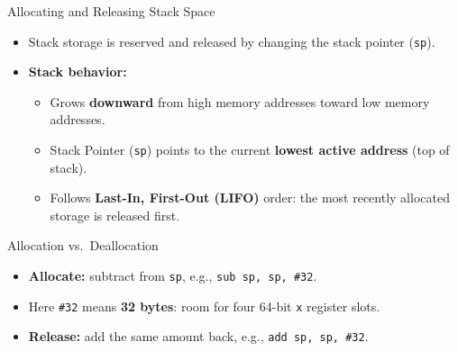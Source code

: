\documentclass[aspectratio=169,11pt,t]{beamer}
\newcommand{\key}[1]{\textbf{#1}}
\newcommand{\bits}[1]{\texttt{#1}}
\newcommand{\code}[1]{\texttt{#1}}
\begin{document}
\begin{frame}{Allocating and Releasing Stack Space}
\large
\begin{itemize}\setlength{\itemsep}{6pt}
  \item Stack storage is reserved and released by changing the stack pointer (\bits{sp}).
  \item \key{Stack behavior:}
  \begin{itemize}\setlength{\itemsep}{3pt}
    \item Grows \textbf{downward} from high memory addresses toward low memory addresses.
    \item Stack Pointer (\bits{sp}) points to the current \key{lowest active address} (top of stack).
    \item Follows \key{Last-In, First-Out (LIFO)} order: the most recently allocated storage is released first.
  \end{itemize}
\end{itemize}

\vspace{0.22cm}
\begin{block}{Allocation vs.\ Deallocation}
\begin{itemize}\setlength{\itemsep}{3pt}
  \item \key{Allocate:} subtract from \bits{sp}, e.g., \code{sub sp, sp, \#32}.
  \item Here \code{\#32} means \key{32 bytes}: room for four 64-bit \bits{x} register slots.
  \item \key{Release:} add the same amount back, e.g., \code{add sp, sp, \#32}.
\end{itemize}
\end{block}
\end{frame}
\end{document}
